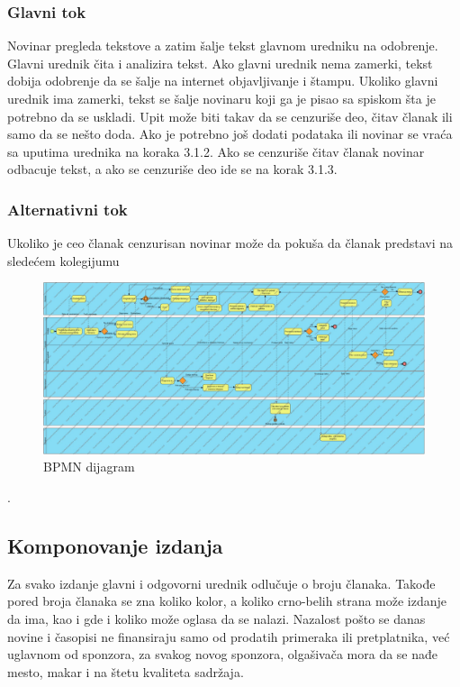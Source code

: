 \subsubsection{Glavni tok}
Novinar pregleda tekstove a zatim šalje tekst glavnom uredniku na odobrenje. Glavni urednik čita i analizira tekst. Ako glavni urednik nema zamerki, tekst dobija odobrenje da se šalje na internet objavljivanje i štampu. Ukoliko glavni urednik ima zamerki, tekst se šalje novinaru koji ga je pisao sa spiskom šta je potrebno da se uskladi. Upit može biti takav da se cenzuriše deo, čitav članak ili samo da se nešto doda. Ako je potrebno još dodati podataka ili novinar se vraća sa uputima urednika na koraka 3.1.2. Ako se cenzuriše čitav članak novinar odbacuje tekst, a ako se cenzuriše deo ide se na korak 3.1.3.
\subsubsection{Alternativni tok}
Ukoliko je ceo članak cenzurisan novinar može da pokuša da članak predstavi na sledećem kolegijumu 

	

\begin{figure}[h]
    \centering
    \includegraphics[width=1.0\textwidth]{slike/1-bpmn}
    \caption{BPMN dijagram}
    \label{pisanje}
\end{figure}	


.

\subsection{Komponovanje izdanja}
Za svako izdanje glavni i odgovorni urednik odlučuje o broju članaka. Takođe pored broja članaka se zna koliko kolor, a koliko crno-belih strana može izdanje da ima, kao i gde i koliko može oglasa da se nalazi. Nazalost pošto se danas novine i časopisi ne finansiraju samo od prodatih primeraka ili pretplatnika, već uglavnom od sponzora, za svakog novog sponzora, olgašivača mora da se nađe mesto, makar i na štetu kvaliteta sadržaja.

